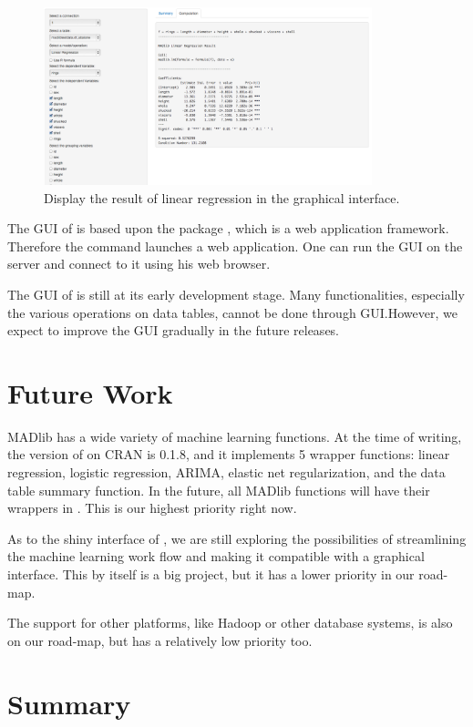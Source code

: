 \begin{figure}
 \centering
  \includegraphics[width=0.85\textwidth]{gui_linregr.png}
  \caption{Display the result of linear regression in the graphical interface.}
\label{fig:gui_linregr}
\end{figure}

The GUI of  is based upon the package , which
is a web application framework. Therefore the command 
launches a web application. One can run the GUI on the server and
connect to it using his web browser.

The GUI of  is still at its early development
stage. Many functionalities, especially the various operations on data
tables, cannot be done through GUI.\@ However, we expect to improve
the GUI gradually in the future releases.

\section{Future Work}
MADlib has a wide variety of machine learning functions.  At the time
of writing, the version of  on CRAN is 0.1.8, and it
implements 5 wrapper functions: linear regression, logistic
regression, ARIMA, elastic net regularization, and the data table
summary function. In the future, all MADlib functions will have their
wrappers in . This is our highest priority right now.

As to the shiny interface of , we are still exploring
the possibilities of streamlining the machine learning work flow and
making it compatible with a graphical interface. This by itself is a
big project, but it has a lower priority in our road-map.

The support for other platforms, like Hadoop or other database systems, is
also on our road-map, but has a relatively low priority too.

\section{Summary}

